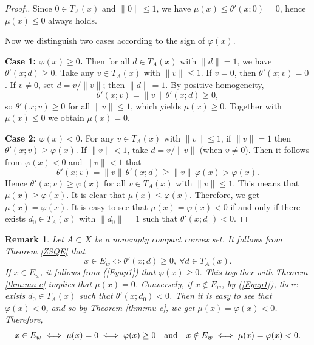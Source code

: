 \documentclass[11pt]{article}
\newtheorem{remark}{Remark}[section]
\begin{document}
\begin{proof}[Proof.]
	Since \(0\in T_A(x)\) and \(\|0\|\le1\), we have \(\mu(x)\le\theta'(x;0)=0\), hence \(\mu(x)\le0\) always holds.
	
	Now we distinguish two cases according to the sign of $\varphi(x)$.
	
	\noindent\textbf{Case 1: \(\varphi(x)\ge 0\).} Then for all \(d\in T_A(x)\) with \(\|d\|=1\), we have \(\theta'(x;d)\ge 0\). Take any \(v\in T_A(x)\) with \(\|v\|\le1\). If \(v=0\), then \(\theta'(x;v)=0\). If \(v\neq0\), set \(d=v/\|v\|\); then \(\|d\|=1\). By positive homogeneity,
	\[
	\theta'(x;v)=\|v\|\,\theta'(x;d)\ge 0,
	\]
	so \(\theta'(x;v)\ge0\) for all \(\|v\|\le1\), which yields \(\mu(x)\ge0\). Together with \(\mu(x)\le0\) we obtain \(\mu(x)=0\).
	
	\noindent\textbf{Case 2: \(\varphi(x)<0\).} For any \(v\in T_A(x)\) with \(\|v\|\le1\), if \(\|v\|=1\) then \(\theta'(x;v)\ge \varphi(x)\).   If \(\|v\|<1\), take \(d=v/\|v\|\) (when \(v\neq0\)). Then it follows from   \(\varphi(x)<0\) and \(\|v\|   < 1\)    that  
	\[
	\theta'(x;v)=\|v\|\,\theta'(x;d)\ge \|v\|\,\varphi(x) > \varphi(x).
	\]
  Hence \(\theta'(x;v)\ge \varphi(x)\) for all \(v\in T_A(x)\) with \(\|v\|\le1\). 
  This means that \(\mu(x)  \geq   \varphi(x)\).   It is clear that \(\mu(x)  \leq   \varphi(x)\). Therefore, we get  \(\mu(x)=\varphi(x)\).  It is easy to see that   \(\mu(x) =  \varphi(x)<0\) if and only if 
   there exists \(d_0\in T_A(x)\) with \(\|d_0\|=1\) such that \(\theta'(x;d_0)<0\). 
\end{proof}
 

\begin{remark} \label{Rxdt}  Let  $A\subset X$ be a nonempty compact convex set.   It follows from Theorem  \ref{ZSQE} that
	\begin{equation}\label{Eyup1}
x\in E_w\iff \theta'(x;d)\ge0,\ \forall d\in T_A(x). 
\end{equation}
If $x\in E_w$,   it follows from  (\ref{Eyup1})  that    \(\varphi(x)\ge 0\).  This together with  Theorem  \ref{thm:mu-c}  implies that  \(\mu(x)=0\).  Conversely, if \(x \notin E_w\),  by  (\ref{Eyup1}),   there exists  \(d_0\in T_A(x)\)   such that \(\theta'(x;d_0)<0\).  Then it is easy to see that    \(\varphi(x) < 0\),  and so  by Theorem  \ref{thm:mu-c}, we get  \(\mu(x) = \varphi(x) < 0\). Therefore,
\[
x \in E_w \iff \mu(x) = 0 \iff \varphi(x) \ge 0   \quad   {\rm{and }}    \quad   x \notin E_w \iff \mu(x) = \varphi(x) < 0.
\]
 \end{remark}
\end{document}
